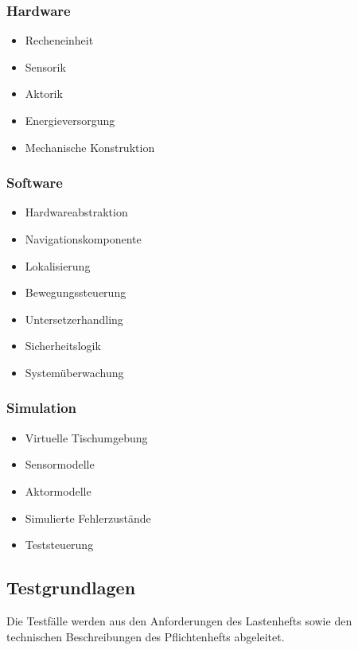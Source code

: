 \subsubsection{Hardware}\label{hardware}

\begin{itemize}
\tightlist
\item
  Recheneinheit
\item
  Sensorik
\item
  Aktorik
\item
  Energieversorgung
\item
  Mechanische Konstruktion
\end{itemize}

\subsubsection{Software}\label{software}

\begin{itemize}
\tightlist
\item
  Hardwareabstraktion
\item
  Navigationskomponente
\item
  Lokalisierung
\item
  Bewegungssteuerung
\item
  Untersetzerhandling
\item
  Sicherheitslogik
\item
  Systemüberwachung
\end{itemize}

\subsubsection{Simulation}\label{simulation}

\begin{itemize}
\tightlist
\item
  Virtuelle Tischumgebung
\item
  Sensormodelle
\item
  Aktormodelle
\item
  Simulierte Fehlerzustände
\item
  Teststeuerung
\end{itemize}

\subsection{Testgrundlagen}\label{testgrundlagen}

Die Testfälle werden aus den Anforderungen des Lastenhefts sowie den
technischen Beschreibungen des Pflichtenhefts abgeleitet.

